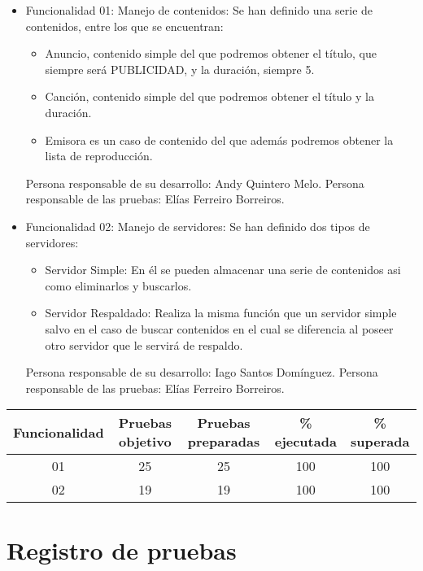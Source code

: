 \documentclass[DIV=calc,paper=a4,fontsize=11pt,onecolumn]{scrartcl}	 %
\begin{document}
\begin{itemize}
	\item{Funcionalidad 01: Manejo de contenidos: Se han definido una serie de contenidos, entre los que se encuentran:}
	\begin{itemize}
		\item{Anuncio, contenido simple del que podremos obtener el título, que siempre será PUBLICIDAD, y la duración, siempre 5.}
        \item{Canción, contenido simple del que podremos obtener el título y la duración.}
		\item{Emisora es un caso de contenido del que además podremos obtener la lista de reproducción.}
	\end{itemize}	
	Persona responsable de su desarrollo: Andy Quintero Melo.
	\newline
	Persona responsable de las pruebas: Elías Ferreiro Borreiros.
	
	\item{Funcionalidad 02: Manejo de servidores: Se han definido dos tipos de servidores:}
	\begin{itemize}
		\item{Servidor Simple: En él se pueden almacenar una serie de contenidos asi como eliminarlos y buscarlos.}		
		\item{Servidor Respaldado: Realiza la misma función que un servidor simple salvo en el caso de buscar contenidos en el cual se diferencia al poseer otro servidor que le servirá de respaldo.}
	\end{itemize}
	Persona responsable de su desarrollo: Iago Santos Domínguez.	
	Persona responsable de las pruebas: Elías Ferreiro Borreiros.
\end{itemize}
\begin{center}
\small \sffamily
\begin{tabular}{|c|c|c|c|c|}
	\hline
	Funcionalidad  & Pruebas objetivo & Pruebas preparadas & \% ejecutada & \% superada 
	\\ \hline
	01 & 25 & 25 & 100 & 100
	\\ \hline
	02 & 19 & 19 & 100 & 100
	\\ \hline
\end{tabular}
\end{center}

\clearpage

\section{Registro de pruebas}
\end{document}
